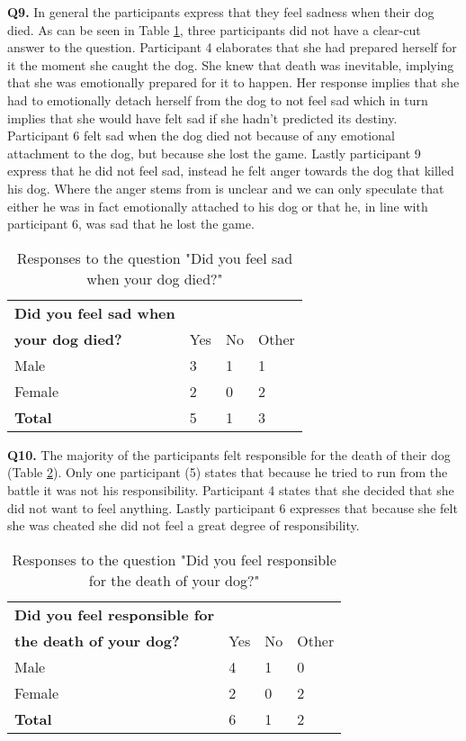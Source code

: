 \textbf{Q9.} In general the participants express that they feel sadness when their dog died. As can be seen in Table \ref{tab:sad}, three participants did not have a clear-cut answer to the question. Participant 4 elaborates that she had prepared herself for it the moment she caught the dog. She knew that death was inevitable, implying that she was emotionally prepared for it to happen. Her response implies that she had to emotionally detach herself from the dog to not feel sad which in turn implies that she would have felt sad if she hadn't predicted its destiny. Participant 6 felt sad when the dog died not because of any emotional attachment to the dog, but because she lost the game. Lastly participant 9 express that he did not feel sad, instead he felt anger towards the dog that killed his dog. Where the anger stems from is unclear and we can only speculate that either he was in fact emotionally attached to his dog or that he, in line with participant 6, was sad that he lost the game.

\begin{table}[h]
\centering
\begin{tabular}{l l l l}
\hline
\textbf{Did you feel sad when}\\
\textbf{your dog died?} & Yes & No & Other \\
\hline
Male & 3 & 1 & 1 \\
Female & 2 & 0 & 2 \\
\textbf{Total} & 5 & 1 & 3 \\
\hline
\end{tabular}
\caption{\label{tab:sad}Responses to the question "Did you feel sad when your dog died?"}
\end{table}


\textbf{Q10.} The majority of the participants felt responsible for the death of their dog (Table \ref{tab:death}). Only one participant (5) states that because he tried to run from the battle it was not his responsibility. Participant 4 states that she decided that she did not want to feel anything. Lastly participant 6 expresses that because she felt she was cheated she did not feel a great degree of responsibility.

\begin{table}[h]
\centering
\begin{tabular}{l l l l}
\hline
\textbf{Did you feel responsible for}\\
\textbf{the death of your dog?} & Yes & No & Other \\
\hline
Male & 4 & 1 & 0 \\
Female & 2 & 0 & 2 \\
\textbf{Total} & 6 & 1 & 2 \\
\hline
\end{tabular}
\caption{\label{tab:death}Responses to the question "Did you feel responsible for the death of your dog?"}
\end{table}



